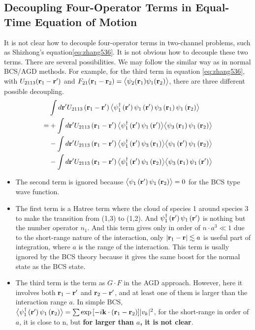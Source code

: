 \subsection{Decoupling Four-Operator Terms in Equal-Time Equation of Motion }
It is not clear how to decouple four-operator terms in two-channel problems, such as Shizhong's equation\eqref{eq:zhang536}.  It is not obvious how to decouple these two terms.  There are several possibilities.  We may follow the similar way as in normal BCS/AGD methods.  For example, for the third term in equation \eqref{eq:zhang536}, with $U_{2113}(\mathbf{r}_1-\mathbf{r}')$ and $F_{21}(\mathbf{r}_1-\mathbf{r}_2)=\bigl<{\psi_2(\mathbf{r}_1)\psi_1(\mathbf{r}_2)}\bigr>$, there are three different possible decoupling.  
\begin{equation}\begin{split}\label{eq:decouple}
&\int{d}\mathbf{r}'U_{2113}\left(\mathbf{r}_1-\mathbf{r}'\right)\bigl<{\psi^\dagger_{1}\left(\mathbf{r}'\right)\psi_1\left(\mathbf{r}'\right)\psi_3\left(\mathbf{r}_1\right)\psi_1\left(\mathbf{r}_2\right)}\bigr>\\
=&+\int{d}\mathbf{r}'U_{2113}\left(\mathbf{r}_1-\mathbf{r}'\right)\bigl<{\psi^\dagger_{1}\left(\mathbf{r}'\right)\psi_1\left(\mathbf{r}'\right)}\bigr>\bigl<{\psi_3\left(\mathbf{r}_1\right)\psi_1\left(\mathbf{r}_2\right)}\bigr>\\
&-\int{d}\mathbf{r}'U_{2113}\left(\mathbf{r}_1-\mathbf{r}'\right)\bigl<{\psi^\dagger_{1}\left(\mathbf{r}'\right)\psi_3\left(\mathbf{r}_1\right)}\bigr>\bigl<{\psi_1\left(\mathbf{r}'\right)\psi_1\left(\mathbf{r}_2\right)}\bigr>\\
&-\int{d}\mathbf{r}'U_{2113}\left(\mathbf{r}_1-\mathbf{r}'\right)\bigl<{\psi^\dagger_{1}\left(\mathbf{r}'\right)\psi_1\left(\mathbf{r}_2\right)}\bigr>\bigl<{\psi_3\left(\mathbf{r}_1\right)\psi_1\left(\mathbf{r}'\right)}\bigr>
\end{split}\end{equation}
\begin{itemize}
	\item The second term is ignored because $\bigl<{\psi_1\left(\mathbf{r}'\right)\psi_1\left(\mathbf{r}_2\right)}\bigr>=0$ for the BCS type wave function. 
	\item The first term is a Hatree term where the cloud of species 1 around species 3 to make the transition from (1,3) to (1,2).  And $\psi^\dagger_{1}\left(\mathbf{r}'\right)\psi_1\left(\mathbf{r}'\right)$ is nothing but the number operator $n_1$.  And this term gives only in order of $n\cdot{a^3}\ll1$ due to the short-range nature of the interaction, only $\lvert{\ensuremath{\mathbf{r}}_1-\ensuremath{\mathbf{r}}}\rvert\lesssim{a}$ is useful part of integration, where $a$ is the range of the interaction.  This term is usally ignored by the BCS theory because it gives the same boost for the normal state as the BCS state.
\item  The third term is the term as $G\cdot{F}$ in the AGD approach. However, here it involves both $\mathbf{r}_1-\mathbf{r}'$ and $\mathbf{r}_2-\mathbf{r}'$, and at least one of them is larger than the interaction range $a$.  In simple BCS, $\bigl<{\psi^\dagger_{1}\left(\mathbf{r}'\right)\psi_1\left(\mathbf{r}_2\right)}\bigr>=\sum{\exp\ensuremath{\left[-i\mathbf{k}\cdot(\mathbf{r}_1-\mathbf{r}_2)\right]}}\lvert{v_k}\rvert^2$, for the short-range in order of $a$, it is close to n, but \textbf{for larger than $a$, it is not clear}. 
 \end{itemize} 
